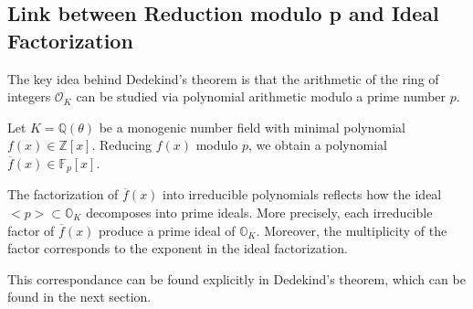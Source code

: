 \subsection{Link between Reduction modulo p and Ideal Factorization}
The key idea behind Dedekind's theorem is that the arithmetic of the ring of integers $\mathcal{O}_K$ can be studied via polynomial arithmetic modulo a prime number $p$.

\medskip 

Let $K=\mathbb{Q}(\theta)$ be a monogenic number field with minimal polynomial $f(x) \in \mathbb{Z}[x]$.
Reducing $f(x)$ modulo $p$, we obtain a polynomial $\overline{f}(x) \in \mathbb{F}_p[x]$.

\medskip 

The factorization of $\overline{f}(x)$ into irreducible polynomials reflects how the ideal $<p> \subset \mathbb{O}_K$ decomposes into prime ideals.
More precisely, each irreducible factor of $\overline{f}(x)$ produce a prime ideal of $\mathbb{O}_K$. Moreover, the multiplicity of the factor corresponds to the exponent in the ideal factorization.

\medskip 

This correspondance can be found explicitly in Dedekind's theorem, which can be found in the next section. 

\bigskip



